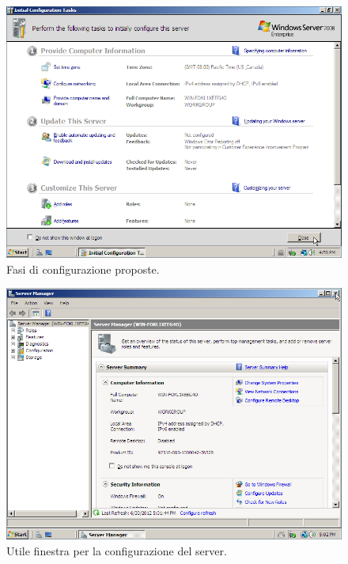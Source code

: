 \begin{figure}[htbp]
 \centering
 \includegraphics[scale=0.5]{images/grab0015}
 \caption{Fasi di configurazione proposte.}
\label{fig:grab0015}
\end{figure}

\begin{figure}[htbp]
 \centering
 \includegraphics[scale=0.5]{images/grab0016}
 \caption{Utile finestra per la configurazione del server.}
\label{fig:grab0016}
\end{figure}

